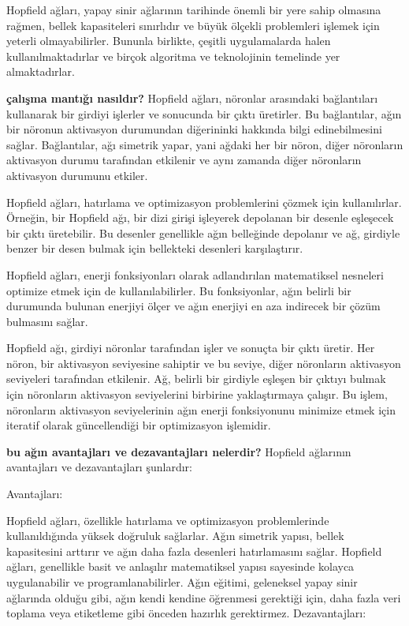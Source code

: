 \documentclass[11pt]{article}
\begin{document}
Hopfield ağları, yapay sinir ağlarının tarihinde önemli bir yere sahip olmasına rağmen, bellek kapasiteleri sınırlıdır ve büyük ölçekli problemleri işlemek için yeterli olmayabilirler. Bununla birlikte, çeşitli uygulamalarda halen kullanılmaktadırlar ve birçok algoritma ve teknolojinin temelinde yer almaktadırlar.

\textbf{çalışma mantığı nasıldır?}
Hopfield ağları, nöronlar arasındaki bağlantıları kullanarak bir girdiyi işlerler ve sonucunda bir çıktı üretirler. Bu bağlantılar, ağın bir nöronun aktivasyon durumundan diğerininki hakkında bilgi edinebilmesini sağlar. Bağlantılar, ağı simetrik yapar, yani ağdaki her bir nöron, diğer nöronların aktivasyon durumu tarafından etkilenir ve aynı zamanda diğer nöronların aktivasyon durumunu etkiler.

Hopfield ağları, hatırlama ve optimizasyon problemlerini çözmek için kullanılırlar. Örneğin, bir Hopfield ağı, bir dizi girişi işleyerek depolanan bir desenle eşleşecek bir çıktı üretebilir. Bu desenler genellikle ağın belleğinde depolanır ve ağ, girdiyle benzer bir desen bulmak için bellekteki desenleri karşılaştırır.

Hopfield ağları, enerji fonksiyonları olarak adlandırılan matematiksel nesneleri optimize etmek için de kullanılabilirler. Bu fonksiyonlar, ağın belirli bir durumunda bulunan enerjiyi ölçer ve ağın enerjiyi en aza indirecek bir çözüm bulmasını sağlar.

Hopfield ağı, girdiyi nöronlar tarafından işler ve sonuçta bir çıktı üretir. Her nöron, bir aktivasyon seviyesine sahiptir ve bu seviye, diğer nöronların aktivasyon seviyeleri tarafından etkilenir. Ağ, belirli bir girdiyle eşleşen bir çıktıyı bulmak için nöronların aktivasyon seviyelerini birbirine yaklaştırmaya çalışır. Bu işlem, nöronların aktivasyon seviyelerinin ağın enerji fonksiyonunu minimize etmek için iteratif olarak güncellendiği bir optimizasyon işlemidir.

\textbf{bu ağın avantajları ve dezavantajları nelerdir?}
Hopfield ağlarının avantajları ve dezavantajları şunlardır:

Avantajları:

Hopfield ağları, özellikle hatırlama ve optimizasyon problemlerinde kullanıldığında yüksek doğruluk sağlarlar.
Ağın simetrik yapısı, bellek kapasitesini arttırır ve ağın daha fazla desenleri hatırlamasını sağlar.
Hopfield ağları, genellikle basit ve anlaşılır matematiksel yapısı sayesinde kolayca uygulanabilir ve programlanabilirler.
Ağın eğitimi, geleneksel yapay sinir ağlarında olduğu gibi, ağın kendi kendine öğrenmesi gerektiği için, daha fazla veri toplama veya etiketleme gibi önceden hazırlık gerektirmez.
Dezavantajları:
\end{document}
